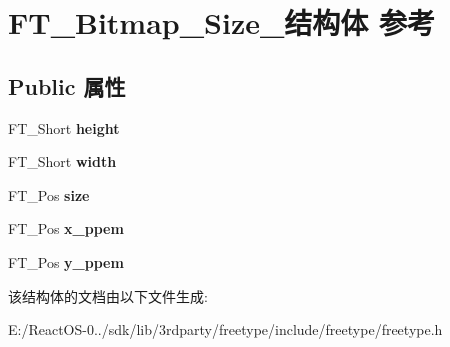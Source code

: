 \hypertarget{struct_f_t___bitmap___size__}{}\section{F\+T\+\_\+\+Bitmap\+\_\+\+Size\+\_\+结构体 参考}
\label{struct_f_t___bitmap___size__}
\subsection*{Public 属性}
\begin{DoxyCompactItemize}
\item 
\mbox{\label{struct_f_t___bitmap___size___adf2f24039b458ff4674712886f242262}} 
F\+T\+\_\+\+Short {\bfseries height}
\item 
\mbox{\label{struct_f_t___bitmap___size___ab9da94223f75a89a649d1e6d018b17f1}} 
F\+T\+\_\+\+Short {\bfseries width}
\item 
\mbox{\label{struct_f_t___bitmap___size___a1db23a6220fb6bcb712430821a6e5352}} 
F\+T\+\_\+\+Pos {\bfseries size}
\item 
\mbox{\label{struct_f_t___bitmap___size___a6f877a792d2dc93328037c928979215f}} 
F\+T\+\_\+\+Pos {\bfseries x\+\_\+ppem}
\item 
\mbox{\label{struct_f_t___bitmap___size___a60d4d003d09fd57505f69f39e31e19c1}} 
F\+T\+\_\+\+Pos {\bfseries y\+\_\+ppem}
\end{DoxyCompactItemize}


该结构体的文档由以下文件生成\+:\begin{DoxyCompactItemize}
\item 
E\+:/\+React\+O\+S-\/0../sdk/lib/3rdparty/freetype/include/freetype/freetype.\+h\end{DoxyCompactItemize}
